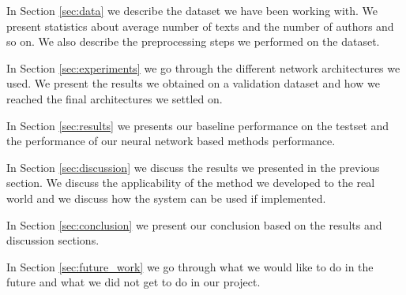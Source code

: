 In Section \ref{sec:data} we describe the dataset we have been working with. We
present statistics about average number of texts and the number of authors and
so on. We also describe the preprocessing steps we performed on the dataset.

In Section \ref{sec:experiments} we go through the different network
architectures we used. We present the results we obtained on a validation
dataset and how we reached the final architectures we settled on.

In Section \ref{sec:results} we presents our baseline performance on the testset
and the performance of our neural network based methods performance.

In Section \ref{sec:discussion} we discuss the results we presented in the
previous section. We discuss the applicability of the method we developed to the
real world and we discuss how the system can be used if implemented.

In Section \ref{sec:conclusion} we present our conclusion based on the results
and discussion sections.

In Section \ref{sec:future_work} we go through what we would like to do in the
future and what we did not get to do in our project.
